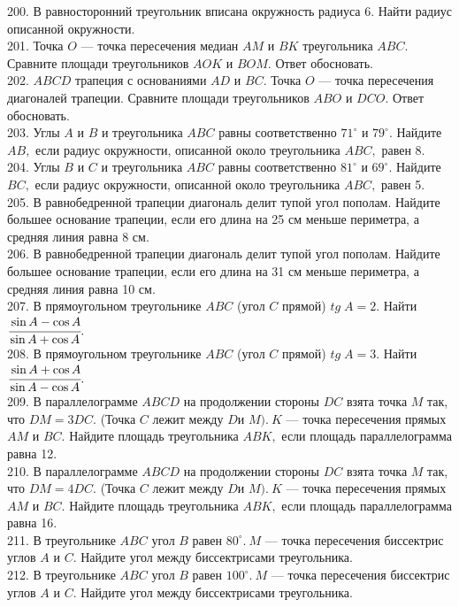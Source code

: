 \documentclass[12pt]{article}
\begin{document}
200. В равносторонний треугольник вписана окружность радиуса 6. Найти радиус описанной окружности.\\
201. Точка $O$ --- точка пересечения медиан $AM$ и $BK$ треугольника $ABC.$ Сравните площади треугольников $AOK$ и $BOM.$ Ответ обосновать.\\
202. $ABCD$ трапеция с основаниями $AD$ и $BC.$ Точка $O$ --- точка пересечения диагоналей трапеции. Сравните площади треугольников $ABO$ и $DCO.$ Ответ обосновать.\\
203. Углы $A$ и $B$ и треугольника $ABC$ равны соответственно $71^\circ$ и $79^\circ.$ Найдите $AB,$ если радиус окружности, описанной около треугольника $ABC,$ равен 8.\\
204. Углы $B$ и $C$ и треугольника $ABC$ равны соответственно $81^\circ$ и $69^\circ.$ Найдите $BC,$ если радиус окружности, описанной около треугольника $ABC,$ равен 5.\\
205. В равнобедренной трапеции диагональ делит тупой угол пополам. Найдите большее основание трапеции, если его длина на 25 см меньше периметра, а средняя линия равна 8 см.\\
206. В равнобедренной трапеции диагональ делит тупой угол пополам. Найдите большее основание трапеции, если его длина на 31 см меньше периметра, а средняя линия равна 10 см.\\
207. В прямоугольном треугольнике $ABC$ (угол $C$ прямой) $tg\; A=2.$ Найти $\cfrac{\sin A -\cos A}{\sin A +\cos A}.$\\
208. В прямоугольном треугольнике $ABC$ (угол $C$ прямой) $tg\; A=3.$ Найти $\cfrac{\sin A +\cos A}{\sin A - \cos A}.$\\
209. В параллелограмме $ABCD$ на продолжении стороны $DC$ взята точка $M$ так, что $DM=3DC.$ (Точка $C$
лежит между $D$и $M).\ K$ --- точка пересечения прямых $AM$ и $BC.$ Найдите площадь треугольника $ABK,$ если
площадь параллелограмма равна 12.\\
210. В параллелограмме $ABCD$ на продолжении стороны $DC$ взята точка $M$ так, что $DM=4DC.$ (Точка $C$
лежит между $D$и $M).\ K$ --- точка пересечения прямых $AM$ и $BC.$ Найдите площадь треугольника $ABK,$ если
площадь параллелограмма равна 16.\\
211. В треугольнике $ABC$ угол $B$ равен $80^\circ.\ M$ --- точка пересечения биссектрис углов $A$ и $C.$
Найдите угол между биссектрисами треугольника.\\
212. В треугольнике $ABC$ угол $B$ равен $100^\circ.\ M$ --- точка пересечения биссектрис углов $A$ и $C.$
Найдите угол между биссектрисами треугольника.\\
\end{document}
